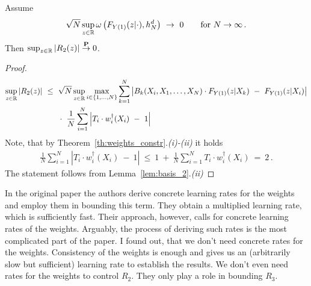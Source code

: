 \begin{lemma}
\label{aa:mean:l:r2}
  Assume
  \begin{align*}
    \sqrt{N}
    \sup_{z\in\R}
    \omega
    \left( 
      F_{Y(1)}(z|\cdot)
      ,h_N^d
    \right)
    \ 
    \to 
    \ 
    0
    \qquad
    \text{for}\ 
    N\to\infty
    \,.
  \end{align*}
  Then $\sup_{z\in\mathbb{R}}|R_2(z)|\overset{\mathbf{P}}{\to} 0$.
\end{lemma}
\begin{proof}
  \begin{align*}
    \sup_{z\in\R}
    \left| R_2(z) \right|
    &
    \  
    \le
    \  
        \sqrt{N}
        \sup_{z\in\R}
        \max_{i\in \left\{ 1,\ldots,N \right\}}
        \sum_{k=1}^{N}
            \left|
        B_k(X_i,X_1,\ldots,X_N)
        \cdot
        F_{Y(1)}(z|X_k)
            \ 
            -
            \ 
        F_{Y(1)}(z|X_i)
            \right|
            \\
            &
            \qquad
            \cdot
            \ 
    \frac{1}{N}
    \sum_{i=1}^{N} 
      \left| 
    T_i\cdot w^\dagger_i(X_i) 
    \ 
    -
    \ 
    1 
      \right|
  \end{align*}
  Note, that by Theorem~\ref{th:weights_constr}.\textit{(i)-(ii)}
  it holds
  \begin{align*}
    \frac{1}{N}
    \sum_{i=1}^{N} 
      \left| 
    T_i\cdot w^\dagger_i(X_i) 
    \ 
    -
    \ 
    1 
      \right|
      \ 
    \le
      \ 
    1
    \ 
    +
    \ 
    \frac{1}{N}
    \sum_{i=1}^{N} 
    T_i\cdot w^\dagger_i(X_i) 
    \ 
    =
    \ 
    2
    \,.
  \end{align*}
  The statement follows from Lemma~\ref{lem:basis_2}.\textit{(ii)}
\end{proof}
\begin{remark}
In the original paper \cite{Wang2019} the authors derive concrete learning rates for the weights and employ them in bounding this term. They obtain a multiplied learning rate, which is sufficiently fast. Their approach, however, calls for concrete learning rates of the weights. Arguably, the process of deriving such rates is the most complicated part of the paper. 
I found out, that we don't need concrete rates for the weights. 
Consistency of the weights is enough and gives us an (arbitrarily slow but sufficient) learning rate to establish the results.
We don't even need rates for the weights to control $R_2$.
They only play a role in bounding $R_3$. 
\end{remark}


